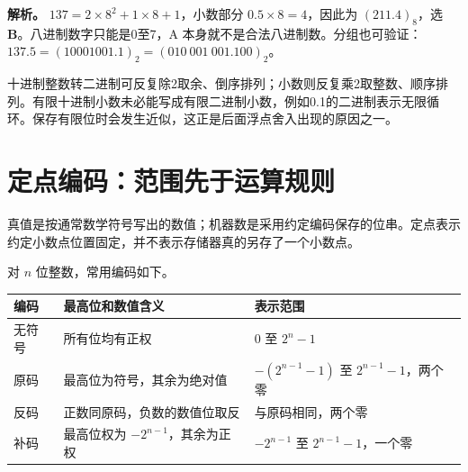 \textbf{解析。} \(137=2\times8^2+1\times8+1\)，小数部分 \(0.5\times8=4\)，因此为 \((211.4)_8\)，选 \textbf{B}。八进制数字只能是0至7，A 本身就不是合法八进制数。分组也可验证：\(137.5=(10001001.1)_2=(010\ 001\ 001.100)_2\)。

十进制整数转二进制可反复除2取余、倒序排列；小数则反复乘2取整数、顺序排列。有限十进制小数未必能写成有限二进制小数，例如0.1的二进制表示无限循环。保存有限位时会发生近似，这正是后面浮点舍入出现的原因之一。

\section{定点编码：范围先于运算规则}\label{CO02-04}

真值是按通常数学符号写出的数值；机器数是采用约定编码保存的位串。定点表示约定小数点位置固定，并不表示存储器真的另存了一个小数点。

对 \(n\) 位整数，常用编码如下。

\begin{wideblock}

\par\medskip\noindent\begin{minipage}{\linewidth}\fontsize{9.3}{12}\selectfont\begin{tabularx}{\linewidth}{@{}YYY@{}}
\toprule\noalign{}
\begin{minipage}[b]{\linewidth}\raggedright
编码
\end{minipage} & \begin{minipage}[b]{\linewidth}\raggedright
最高位和数值含义
\end{minipage} & \begin{minipage}[b]{\linewidth}\raggedright
表示范围
\end{minipage} \\
\midrule\noalign{}


无符号 & 所有位均有正权 & \(0\) 至 \(2^n-1\) \\
原码 & 最高位为符号，其余为绝对值 & \(-(2^{n-1}-1)\) 至 \(2^{n-1}-1\)，两个零 \\
反码 & 正数同原码，负数的数值位取反 & 与原码相同，两个零 \\
补码 & 最高位权为 \(-2^{n-1}\)，其余为正权 & \(-2^{n-1}\) 至 \(2^{n-1}-1\)，一个零 \\
\bottomrule\end{tabularx}
\end{minipage}\par\medskip

\end{wideblock}

